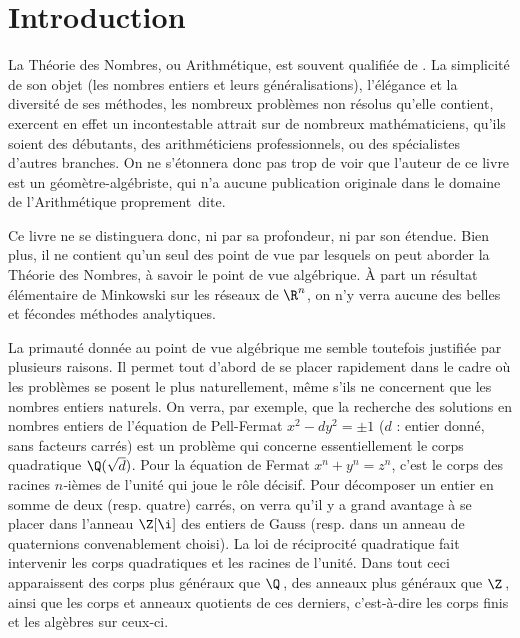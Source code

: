 \documentclass[11pt, %
  title in boldface,
  theorem in new line,
  theorem numbering = section,
  number theorems separately,
  simple name,
]{beaulivre}
\begin{document}
\frontmatter


\tableofcontents

\chapter{Introduction}

    La Théorie des Nombres, ou Arithmétique, est souvent qualifiée de . La simplicité de son objet (les nombres entiers et leurs généralisations), l'élégance et la diversité de ses méthodes, les nombreux problèmes non résolus qu'elle contient, exercent en effet un incontestable attrait sur de nombreux mathématiciens, qu'ils soient des débutants, des arithméticiens professionnels, ou des spécialistes d'autres branches. On ne s'étonnera donc pas trop de voir que l'auteur de ce livre est un géomètre-algébriste, qui n'a aucune publication originale dans le domaine de l'Arithmétique proprement~dite.

    Ce livre ne se distinguera donc, ni par sa profondeur, ni par son étendue. Bien plus, il ne contient qu'un seul des point de vue par lesquels on peut aborder la Théorie des Nombres, à savoir le point de vue algébrique. À part un résultat élémentaire de Minkowski sur les réseaux de \( \R^n \), on n'y verra aucune des belles et fécondes méthodes analytiques.

    La primauté donnée au point de vue algébrique me semble toutefois justifiée par plusieurs raisons. Il permet tout d'abord de se placer rapidement dans le cadre où les problèmes se posent le plus naturellement, même s'ils ne concernent que les nombres entiers naturels. On verra, par exemple, que la recherche des solutions en nombres entiers de l'équation de Pell-Fermat \( x^2 - d y^2 = \pm 1 \) (\( d \) : entier donné, sans facteurs carrés) est un problème qui concerne essentiellement le corps quadratique \( \Q(\sqrt{d}) \). Pour la  équation de Fermat \( x^n + y^n = z^n \), c'est le corps des racines \( n \)‑ièmes de l'unité qui joue le rôle décisif. Pour décomposer un entier en somme de deux (resp. quatre) carrés, on verra qu'il y a grand avantage à se placer dans l'anneau \( \Z[\i] \) des entiers de Gauss (resp. dans un anneau de quaternions convenablement choisi). La loi de réciprocité quadratique fait intervenir les corps quadratiques et les racines de l'unité. Dans tout ceci apparaissent des corps plus généraux que \( \Q \)\,, des anneaux plus généraux que \( \Z \)\,, ainsi que les corps et anneaux quotients de ces derniers, c'est-à-dire les corps finis et les algèbres sur ceux-ci.
\end{document}
